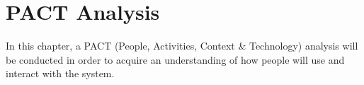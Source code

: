 \section{PACT Analysis}
In this chapter, a PACT (People, Activities, Context \& Technology) analysis will be conducted in order to acquire an understanding of how people will use and interact with the system.
